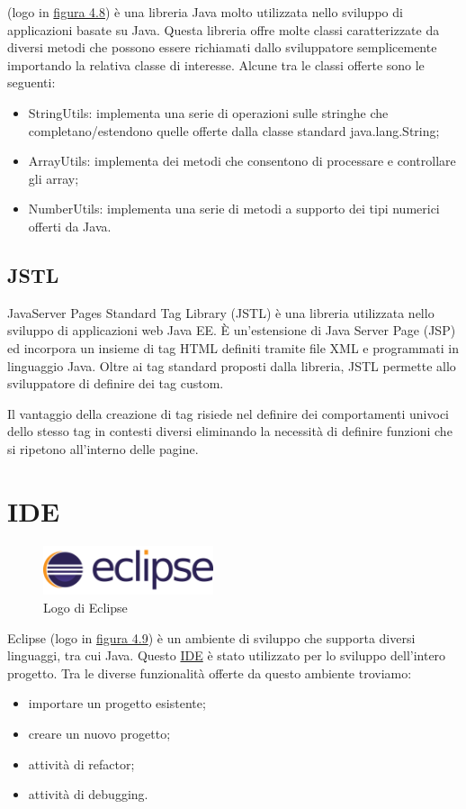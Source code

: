 \ap{{[b]}} (logo in {\hyperref[fig:commons]{figura 4.8}}) è una libreria Java molto utilizzata nello sviluppo di applicazioni basate su Java. Questa libreria offre molte classi caratterizzate da diversi metodi che possono essere richiamati dallo sviluppatore semplicemente importando la relativa classe di interesse. Alcune tra le classi offerte sono le seguenti:
\begin{itemize}
\item StringUtils: implementa una serie di operazioni sulle stringhe che completano/estendono quelle offerte dalla classe standard java.lang.String;
\item ArrayUtils: implementa dei metodi che consentono di processare e controllare gli array; 
\item NumberUtils: implementa una serie di metodi a supporto dei tipi numerici offerti da Java.
\end{itemize} 

\subsection{JSTL}
\noindent JavaServer Pages Standard Tag Library (JSTL) è una libreria utilizzata nello sviluppo di applicazioni web Java EE. È un'estensione di Java Server Page (JSP) ed incorpora un insieme di tag HTML definiti tramite file XML e programmati in linguaggio Java. Oltre ai tag standard proposti dalla libreria, JSTL permette allo sviluppatore di definire dei tag custom. 

\setlength{\parskip}{3ex}

\noindent Il vantaggio della creazione di tag risiede nel definire dei comportamenti univoci dello stesso tag in contesti diversi eliminando la necessità di definire funzioni che si ripetono all'interno delle pagine.

\section{IDE}

\begin{figure}[!h]
	\centering
	\includegraphics[width=5cm]{../images/Eclipse-logo.png}
	\caption{Logo di Eclipse}
	\label{fig:eclipse}
\end{figure}

\noindent Eclipse (logo in {\hyperref[fig:eclipse]{figura 4.9}}) è un ambiente di sviluppo che supporta diversi linguaggi, tra cui Java. Questo {\hyperref[para:ide-definition]{IDE}}\glsfirstoccur \; è stato utilizzato per lo sviluppo dell'intero progetto.
Tra le diverse funzionalità offerte da questo ambiente troviamo:
\begin{itemize}
\item importare un progetto esistente;
\item creare un nuovo progetto;
\item attività di refactor;
\item attività di debugging.
\end{itemize}